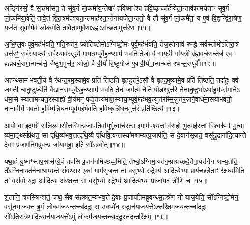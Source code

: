 {\anuvakamend[{स॒प्त॒द॒शम॑न्त॒र्यन्ति॑ वि॒राजीति॒ चतु॑श्चत्वारिꣳशच्च॥३॥}]}

अङ्गि॑रसो॒ वै स॒त्त्रमा॑सत॒ ते सु॑व॒र्गं लो॒कमा॑य॒न्तेषाꣳ॑ ह॒विष्माꣳ॑श्च हवि॒ष्कृच्चा॑हीयेता॒न्ताव॑कामयेताꣳ सुव॒र्गं लो॒कमि॑या॒वेति॒ तावे॒तं द्वि॑रा॒त्रम॑पश्यता॒न्तमाह॑रता॒न्तेना॑यजेता॒न्ततो॒ वै तौ सु॑व॒र्गं लो॒कमै॑तां॒ य ए॒वं वि॒द्वान्द्वि॑रा॒त्रेण॒ यज॑ते सुव॒र्गमे॒व लो॒कमे॑ति॒ तावैता॒म्पूर्वे॒णा\-ऽह्ना\-ऽग॑च्छता॒मुत्त॑रेण॥११॥

अ॒भि॒प्ल॒वः पूर्व॒मह॑र्भवति॒ गति॒रुत्त॑रं॒ ज्योति॑ष्टोमो\-ऽग्निष्टो॒मः पूर्व॒मह॑र्भवति॒ तेज॒स्तेनाव॑ रुन्द्धे॒ सर्व॑स्तोमो\-ऽतिरा॒त्र उत्त॑र॒ꣳ॒ सर्व॒स्याप्त्यै॒ सर्व॒स्याव॑रुद्ध्यै गाय॒त्रम्पूर्वेह॒न्थ्साम॑ भवति॒ तेजो॒ वै गा॑य॒त्री गा॑य॒त्री ब्र॑ह्मवर्च॒सन्तेज॑ ए॒व ब्र॑ह्मवर्च॒स\-मा॒त्मन्ध॑त्ते॒ त्रैष्टु॑भ॒मुत्त॑र॒ ओजो॒ वै वी॒र्यं॑ त्रि॒ष्टुगोज॑ ए॒व वी॒र्य॑मा॒त्मन्ध॑त्ते रथन्त॒रम्पूर्वे᳚॥१२॥

अह॒न्थ्साम॑ भवती॒यं वै र॑थन्त॒रम॒स्यामे॒व प्रति॑ तिष्ठति बृ॒हदुत्त॑रे॒\-ऽसौ वै बृ॒हद॒मुष्या॑मे॒व प्रति॑ तिष्ठति॒ तदा॑हुः॒ क्व॑ जग॑ती चानु॒ष्टुप्चेति॑ वैखान॒सम्पूर्वे\-ऽह॒न्थ्साम॑ भवति॒ तेन॒ जग॑त्यै॒ नैति॑ षोड॒श्युत्त॑रे॒ तेना॑नु॒ष्टुभो\-ऽथा॑हु॒र्यथ्स॑मा॒ने᳚\-ऽ र्धमा॒से स्याता॑मन्यत॒रस्याह्नो॑ वी॒र्य॑मनु॑ पद्ये॒तेत्य॑मावा॒स्या॑या॒म्पूर्व॒मह॑र्भव॒त्युत्त॑रस्मि॒न्नुत्त॑र॒न्नानै॒वार्ध॑मा॒सयो᳚र्भवतो॒ नाना॑वीर्ये भवतो ह॒विष्म॑न्निधन॒म्पूर्व॒मह॑र्भवति हवि॒ष्कृन्नि॑धन॒मुत्त॑रं॒ प्रति॑ष्ठित्यै॥१३॥

{}

आपो॒ वा इ॒दमग्रे॑ सलि॒लमा॑सी॒त्तस्मि॑न्प्र॒जाप॑तिर्वा॒युर्भू॒त्वाच॑र॒त्स इ॒माम॑पश्य॒त्तां व॑रा॒हो भू॒त्वाह॑र॒त्तां वि॒श्वक॑र्मा भू॒त्वा व्य॑मा॒र्ट्थ्साप्र॑थत॒ सा पृ॑थि॒व्य॑भव॒त्तत्पृ॑थि॒व्यै पृ॑थिवि॒त्वन्तस्या॑मश्राम्यत्प्र॒जाप॑तिः॒ स दे॒वान॑सृजत॒ वसू᳚न्रु॒द्राना॑दि॒त्यान्ते दे॒वाः प्र॒जाप॑तिमब्रुव॒न्प्र जा॑यामहा॒ इति॒ सो᳚\-ऽब्रवीत्॥१४॥

यथा॒हं यु॒ष्माꣳस्तप॒सासृ॑क्ष्ये॒वं तप॑सि प्र॒जन॑नमिच्छध्व॒मिति॒ तेभ्यो॒\-ऽग्निमा॒यत॑न॒म्प्राय॑च्छदे॒तेना॒यत॑नेन श्राम्य॒तेति॒ ते᳚\-ऽग्निना॒यत॑नेनाश्राम्य॒न्ते सं॑वथ्स॒र एकां॒ गाम॑सृजन्त॒ तां वसु॑भ्यो रु॒द्रेभ्य॑ आदि॒त्येभ्यः॒ प्राय॑च्छन्ने॒ताꣳ र॑क्षध्व॒मिति॒ तां वस॑वो रु॒द्रा आ॑दि॒त्या अ॑रक्षन्त॒ सा वसु॑भ्यो रु॒द्रेभ्य॑ आदि॒त्येभ्यः॒ प्राजा॑यत॒ त्रीणि॑ च॥१५॥

श॒तानि॒ त्रय॑स्त्रिꣳशतं॒ चाथ॒ सैव स॑हस्रत॒म्य॑भव॒त्ते दे॒वाः प्र॒जाप॑तिमब्रुवन्थ्स॒हस्रे॑ण नो याज॒येति॒ सो᳚\-ऽग्निष्टो॒मेन॒ वसू॑नयाजय॒त्त इ॒मं लो॒कम॑जय॒न्तच्चा॑ददुः॒ स उ॒क्थ्ये॑न रु॒द्रान॑याजय॒त्ते᳚\-ऽन्तरि॑क्षमजय॒न्तच्चा॑ददुः॒ सो॑\-ऽतिरा॒त्रेणा॑\-दि॒त्यान॑याजय॒त्ते॑\-ऽमुं लो॒कम॑जय॒न्तच्चा॑ददु॒स्तद॒न्तरि॑क्षम्॥१६॥

